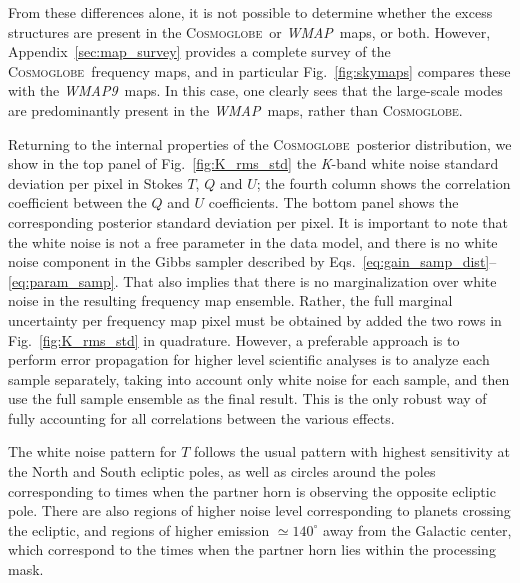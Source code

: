 \documentclass[twocolumn]{../../common/aa}
\def\WMAP{\emph{WMAP}}
\def\WMAPnine{\emph{WMAP9}}
\newcommand{\cosmoglobe}{\textsc{Cosmoglobe}}
\newcommand{\K}[0]{\textit K}
\begin{document}
From these differences alone, it is not possible to determine whether the excess structures are present in the \cosmoglobe\ or \WMAP\ maps, or both. However, Appendix~\ref{sec:map_survey} provides a complete survey of the \cosmoglobe\ frequency maps, and in particular Fig.~\ref{fig:skymaps} compares these with the \WMAPnine\ maps. In this case, one clearly sees that the large-scale modes are predominantly present in the \WMAP\ maps, rather than \cosmoglobe. 

Returning to the internal properties of the \cosmoglobe\ posterior distribution, we show in the top panel of Fig.~\ref{fig:K_rms_std} the \K-band white noise standard deviation per pixel in Stokes $T$, $Q$ and $U$; the fourth column shows the correlation coefficient between the $Q$ and $U$ coefficients. The bottom panel shows the corresponding posterior standard deviation per pixel. It is important to note that the white noise is not a free parameter in the data model, and there is no white noise component in the Gibbs sampler described by Eqs.~\eqref{eq:gain_samp_dist}--\eqref{eq:param_samp}. That also implies that there is no marginalization over white noise in the resulting frequency map ensemble. Rather, the full marginal uncertainty per frequency map pixel must be obtained by added the two rows in Fig.~\ref{fig:K_rms_std} in quadrature. However, a preferable approach is to perform error propagation for higher level scientific analyses is to analyze each sample separately, taking into account only white noise for each sample, and then use the full sample ensemble as the final result. This is the only robust way of fully accounting for all correlations between the various effects.  

The white noise pattern for $T$ follows the usual pattern with highest sensitivity at the North and South ecliptic poles, as well as circles around the poles corresponding to times when the partner horn is observing the opposite ecliptic pole. There are also regions of higher noise level corresponding to planets crossing the ecliptic, and regions of higher emission $\simeq140^\circ$ away from the Galactic center, which correspond to the times when the partner horn lies within the processing mask.
\end{document}
